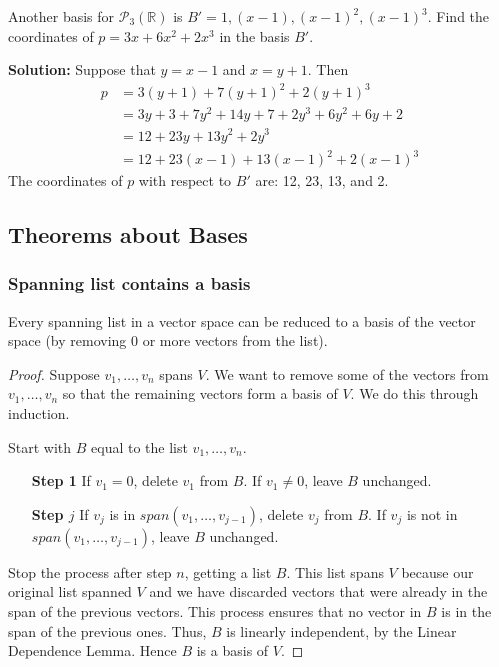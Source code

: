 \documentclass[11pt]{article}
\begin{document}
    \vspace{1em}

    Another basis for \(\mathcal{P}_3(\mathbb{R})\) is \(B' = 1, (x-1), (x-1)^2, (x-1)^3\). Find the coordinates of \(p = 3x + 6x^2 + 2x^3\) in the basis $B'$.

    \vspace{1em}

    \textbf{Solution:} Suppose that \(y = x - 1\) and \(x = y + 1\). Then 
    \begin{align*}
        p &= 3(y+1) + 7(y + 1)^2 + 2(y+1)^3 \\
          &= 3y + 3 + 7y^2 + 14y + 7 + 2y^3 + 6y^2 + 6y + 2 \\
          &= 12 + 23y + 13 y^2 + 2y^3 \\
          &= 12 + 23(x-1) + 13(x-1)^2 + 2(x-1)^3
    \end{align*}
    The coordinates of $p$ with respect to $B'$ are: 12, 23, 13, and 2.

    \subsection{Theorems about Bases}

    \subsubsection{Spanning list contains a basis}

    Every spanning list in a vector space can be reduced to a basis of the vector space (by removing 0 or more vectors from the list).

    \begin{proof}
        Suppose \(v_1, \dots, v_n\) spans $V$. We want to remove some of the vectors from \( v_1, \dots, v_n \) so that the remaining vectors form a basis of $V$. We do this through induction.

        Start with $B$ equal to the list \(v_1, \dots, v_n.\)

        \begin{enumerate}
            \item[\textbf{Step 1}] If \(v_1 = 0\), delete \(v_1\) from $B$. If \(v_1 \neq 0\), leave $B$ unchanged.
            \item[\textbf{Step $j$}] If \(v_j\) is in \(span(v_1, \dots, v_{j-1})\), delete \(v_j\) from $B$. If \(v_j\) is not in \(span(v_1, \dots, v_{j-1})\), leave $B$ unchanged.  
        \end{enumerate}

        Stop the process after step $n$, getting a list $B$. This list spans $V$ because our original list spanned $V$ and we have discarded vectors that were already in the span of the previous vectors. This process ensures that no vector in $B$ is in the span of the previous ones. Thus, $B$ is linearly independent, by the Linear Dependence Lemma. Hence $B$ is a basis of $V$.
    \end{proof}
\end{document}

